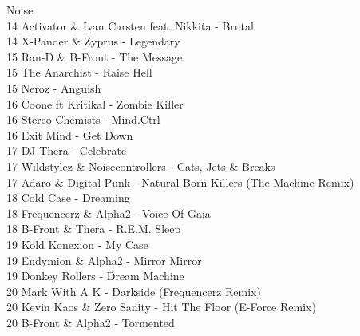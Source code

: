 \begin{multicols}{2}
Noise\\ 14 Activator \& Ivan Carsten feat. Nikkita - Brutal\\ 14 X-Pander \& Zyprus - Legendary\\ 15 Ran-D \& B-Front - The Message\\ 15 The Anarchist - Raise Hell\\ 15 Neroz - Anguish\\ 16 Coone ft Kritikal - Zombie Killer\\ 16 Stereo Chemists - Mind.Ctrl\\ 16 Exit Mind - Get Down\\ 17 DJ Thera - Celebrate\\ 17 Wildstylez \& Noisecontrollers - Cats, Jets \& Breaks\\ 17 Adaro \& Digital Punk - Natural Born Killers (The Machine Remix)\\ 18 Cold Case - Dreaming\\ 18 Frequencerz \& Alpha2 - Voice Of Gaia\\ 18 B-Front \& Thera - R.E.M. Sleep\\ 19 Kold Konexion - My Case\\ 19 Endymion \& Alpha2 - Mirror Mirror\\ 19 Donkey Rollers - Dream Machine\\ 20 Mark With A K - Darkside (Frequencerz Remix)\\ 20 Kevin Kaos \& Zero Sanity - Hit The Floor (E-Force Remix)\\ 20 B-Front \& Alpha2 - Tormented\\
\end{multicols}
